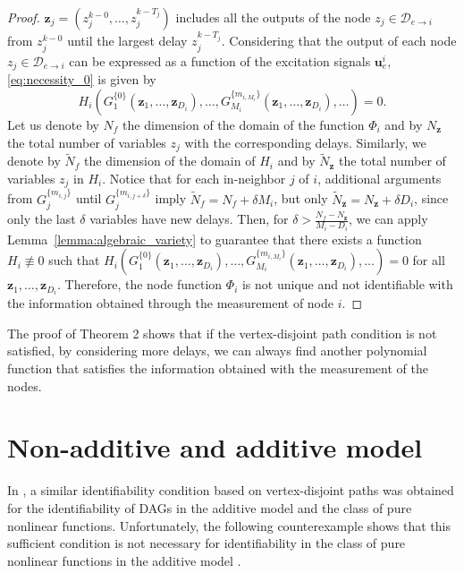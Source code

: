 \documentclass[letterpaper,10pt,journal]{IEEEtran}
\newcommand{\z}{\mathbf{z}}
\newcommand{\uu}{\mathbf{u}}
\begin{document}
\begin{proof}
$\z_j=(z_j^{k-0},\ldots,z_j^{k-T_j})$ includes all the outputs of the node $z_j\in \mathcal{D}_{e\to i}$ from $z_j^{k-0}$ until the largest delay $z_j^{k-T_j}$. Considering that the output of each node $z_j\in \mathcal{D}_{e\to i}$ can be expressed as a function of the excitation signals $\uu_e^i$, \eqref{eq:necessity_0} is given by
\begin{equation*}
    H_i(G_1^{\{0\}}(\z_1,\ldots,\z_{D_i}),\ldots,G_{M_i}^{\{m_{i,M_i}\}}(\z_1,\ldots,\z_{D_i}),\ldots)=0.    
\end{equation*}
Let us denote by $N_f$ the dimension of the domain of the function $\Phi_i$ and by $N_\z$ the total number of variables $z_j$ with the corresponding delays.
Similarly, we denote by $\tilde N_{f}$ the dimension of the domain of $H_i$ and by $\tilde N_\z$ the total number of variables $z_j$ in $H_i$. Notice that for each in-neighbor $j$ of $i$,  additional arguments from $G_j^{\{m_{i,j}\}}$ until $G_j^{\{m_{i,j+\delta}\}}$ imply $\tilde N_f=N_f+\delta M_i$,  but only $\tilde N_\z=N_\z+\delta D_i$, since only the last $\delta$ variables have new delays. Then, for  
$\delta>\frac{N_f-N_\z}{M_i-D_i}$, we can
apply Lemma~\ref{lemma:algebraic_variety} to guarantee that there exists a function $H_i \not\equiv 0$ such that $H_i(G_1^{\{0\}}(\z_1,\ldots,\z_{D_i}),\ldots,G_{M_i}^{\{m_{i,M_i}\}}(\z_1,\ldots,\z_{D_i}),\ldots)=0$ for all $\z_1,\ldots,\z_{D_i}$. 
Therefore, the node function $\Phi_i$ is not unique and not identifiable with the information obtained through the measurement of node $i$.   
\end{proof}









The proof of Theorem 2 shows that if the vertex-disjoint path condition is not satisfied, by considering more delays, we can always find another polynomial function that satisfies the information obtained with the measurement of the nodes.



\section{Non-additive and additive model}\label{sec:linear}


In \cite{vizuete2024partial}, a similar identifiability condition based on vertex-disjoint paths was obtained for the identifiability of DAGs in the additive model and the class of pure nonlinear functions.  
Unfortunately, the following counterexample shows that this sufficient condition is not necessary for identifiability in the class of pure nonlinear functions in the additive model \cite{vizuete2024partial}.
 
\end{document}

